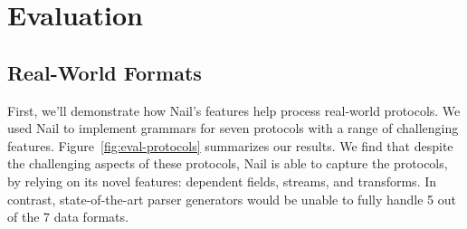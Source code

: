 \section{Evaluation}
\label{s:eval}








\subsection{Real-World Formats}
\label{s:eval-formats}

First, we'll demonstrate how Nail's features help process real-world protocols. We used Nail to implement grammars
for seven protocols with a range of challenging features.
Figure~\ref{fig:eval-protocols} summarizes our results.
We find that despite the challenging aspects of these protocols, Nail is
able to capture the protocols, by relying on its novel features: dependent
fields, streams, and transforms.  In contrast, state-of-the-art parser
generators would be unable to fully handle 5 out of the 7 data formats.

